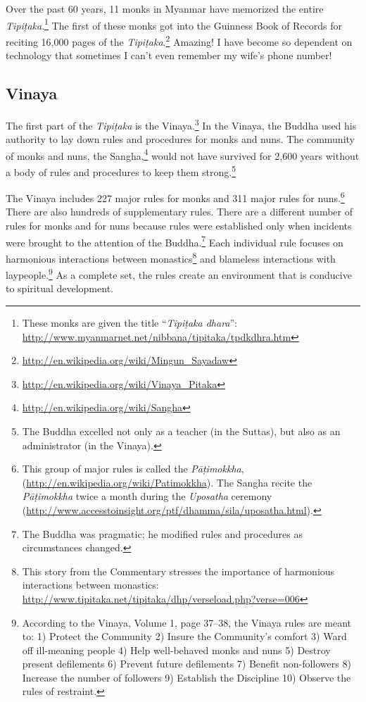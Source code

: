 \pagebreak

Over the past 60 years, 11 monks in Myanmar have memorized the entire \textit{Tipiṭaka}.\footnote{These monks are given the title “\textit{Tipiṭaka dhara}”: \url {http://www.myanmarnet.net/nibbana/tipitaka/tpdkdhra.htm}} The first of these monks got into the Guinness Book of Records for reciting 16,000 pages of the \textit{Tipiṭaka}.\footnote{\url{http://en.wikipedia.org/wiki/Mingun_Sayadaw}} Amazing! I have become so dependent on technology that sometimes I can’t even remember my wife’s phone number!

\subsection*{Vinaya}

The first part of the \textit{Tipiṭaka} is the Vinaya.\footnote{\url{http://en.wikipedia.org/wiki/Vinaya_Pitaka}} In the Vinaya, the Buddha used his authority to lay down rules and procedures for monks and nuns. The community of monks and nuns, the Sangha,\footnote{\url{http://en.wikipedia.org/wiki/Sangha}} would not have survived for 2,600 years without a body of rules and procedures to keep them strong.\footnote{The Buddha excelled not only as a teacher (in the Suttas), but also as an administrator (in the Vinaya).}

The Vinaya includes 227 major rules for monks and 311 major rules for nuns.\footnote{This group of major rules is called the \textit{Pāṭimokkha}, (\url{http://en.wikipedia.org/wiki/Patimokkha}). The Sangha recite the \textit{Pāṭimokkha} twice a month during the \textit{Uposatha} ceremony (\url{http://www.accesstoinsight.org/ptf/dhamma/sila/uposatha.html}).} There are also hundreds of supplementary rules. There are a different number of rules for monks and for nuns because rules were established only when incidents were brought to the attention of the Buddha.\footnote{The Buddha was pragmatic; he modified rules and procedures as circumstances changed.} Each individual rule focuses on harmonious interactions between monastics\footnote{This story from the Commentary stresses the importance of harmonious interactions between monastics: \url{http://www.tipitaka.net/tipitaka/dhp/verseload.php?verse=006}} and blameless interactions with laypeople.\footnote{According to the Vinaya, Volume 1, page 37--38, the Vinaya rules are meant to: 1) Protect the Community 2) Insure the Community’s comfort 3) Ward off ill-meaning people 4) Help well-behaved monks and nuns 5) Destroy present defilements 6) Prevent future defilements 7) Benefit non-followers 8) Increase the number of followers 9) Establish the Discipline 10) Observe the rules of restraint.} As a complete set, the rules create an environment that is conducive to spiritual development.

